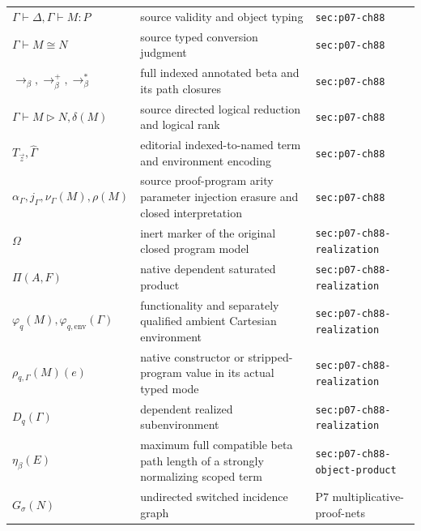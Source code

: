 \begin{longtable}{@{}p{}p{}p{}@{}}
\(\Gamma\vdash\Delta,\allowbreak \Gamma\vdash M:P\) & source validity and object typing & \texttt{sec:\allowbreak{}p07-\allowbreak{}ch88} \\
\(\Gamma\vdash M\cong N\) & source typed conversion judgment & \texttt{sec:\allowbreak{}p07-\allowbreak{}ch88} \\
\(\longrightarrow_\beta,\allowbreak \longrightarrow_\beta^+,\allowbreak \longrightarrow_\beta^*\) & full indexed annotated beta and its path closures & \texttt{sec:\allowbreak{}p07-\allowbreak{}ch88} \\
\(\Gamma\vdash M\mathrel{\triangleright}N,\allowbreak \delta(M)\) & source directed logical reduction and logical rank & \texttt{sec:\allowbreak{}p07-\allowbreak{}ch88} \\
\(T_{\vec z},\allowbreak \widehat\Gamma\) & editorial indexed-to-named term and environment encoding & \texttt{sec:\allowbreak{}p07-\allowbreak{}ch88} \\
\(\alpha_\Gamma,\allowbreak j_\Gamma,\allowbreak \nu_\Gamma(M),\allowbreak \rho(M)\) & source proof-program arity parameter injection erasure and closed interpretation & \texttt{sec:\allowbreak{}p07-\allowbreak{}ch88} \\
\(\Omega\) & inert marker of the original closed program model & \texttt{sec:\allowbreak{}p07-\allowbreak{}ch88-\allowbreak{}realization} \\
\(\Pi(A,\allowbreak F)\) & native dependent saturated product & \texttt{sec:\allowbreak{}p07-\allowbreak{}ch88-\allowbreak{}realization} \\
\(\varphi_q(M),\allowbreak \varphi_{q,\mathrm{env}}(\Gamma)\) & functionality and separately qualified ambient Cartesian environment & \texttt{sec:\allowbreak{}p07-\allowbreak{}ch88-\allowbreak{}realization} \\
\(\rho_{q,\Gamma}(M)(e)\) & native constructor or stripped-program value in its actual typed mode & \texttt{sec:\allowbreak{}p07-\allowbreak{}ch88-\allowbreak{}realization} \\
\(D_q(\Gamma)\) & dependent realized subenvironment & \texttt{sec:\allowbreak{}p07-\allowbreak{}ch88-\allowbreak{}realization} \\
\(\eta_\beta(E)\) & maximum full compatible beta path length of a strongly normalizing scoped term & \texttt{sec:\allowbreak{}p07-\allowbreak{}ch88-\allowbreak{}object-\allowbreak{}product} \\
\(G_\sigma(N)\) & undirected switched incidence graph & P7 multiplicative-\allowbreak{}proof-\allowbreak{}nets \\

\end{longtable}

